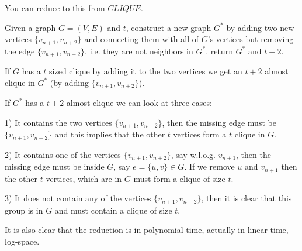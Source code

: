 \documentclass{bschlangaul-aufgabe}
\begin{document}
\begin{bAntwort}
You can reduce to this from $CLIQUE$.

Given a graph $G=(V,E)$ and $t$, construct a new graph $G^*$ by adding
two new vertices $\{v_{n+1},v_{n +2}\}$ and connecting them with all of
$G$'s vertices but removing the edge $\{v_{n+1},v_{n+2}\}$, i.e. they
are not neighbors in $G^*$. return $G^*$ and $t+2$.

If $G$ has a $t$ sized clique by adding it to the two vertices we get an
$t+2$ almost clique in $G^*$ (by adding $\{v_{n+1},v_{n+2}\}$).

If $G^*$ has a $t+2$ almost clique we can look at three cases:

1) It contains the two vertices $\{v_{n+1},v_{n+2}\}$, then the missing
edge must be $\{v_{n+1},v_{n+2}\}$ and this implies that the other $t$
vertices form a $t$ clique in $G$.

2) It contains one of the vertices $\{v_{n+1},v_{n+2}\}$, say w.l.o.g.
$v_{n+1}$, then the missing edge must be inside $G$, say $e=\{u,v\}\in
G$. If we remove $u$ and $v_{n+1}$ then the other $t$ vertices, which
are in $G$ must form a clique of size $t$.

3) It does not contain any of the vertices $\{v_{n+1},v_{n+2}\}$, then
it is clear that this group is in $G$ and must contain a clique of size
$t$.

It is also clear that the reduction is in polynomial time, actually in
linear time, log-space.
\end{bAntwort}
\end{document}
